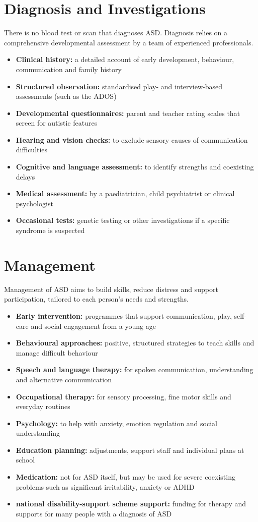 \section*{Diagnosis and Investigations}
There is no blood test or scan that diagnoses ASD. Diagnosis relies on a comprehensive developmental assessment by a team of experienced professionals.

\begin{itemize}
    \item \textbf{Clinical history:} a detailed account of early development, behaviour, communication and family history
    \item \textbf{Structured observation:} standardised play- and interview-based assessments (such as the ADOS)
    \item \textbf{Developmental questionnaires:} parent and teacher rating scales that screen for autistic features
    \item \textbf{Hearing and vision checks:} to exclude sensory causes of communication difficulties
    \item \textbf{Cognitive and language assessment:} to identify strengths and coexisting delays
    \item \textbf{Medical assessment:} by a paediatrician, child psychiatrist or clinical psychologist
    \item \textbf{Occasional tests:} genetic testing or other investigations if a specific syndrome is suspected
\end{itemize}

\section*{Management}
Management of ASD aims to build skills, reduce distress and support participation, tailored to each person's needs and strengths.

\begin{itemize}
    \item \textbf{Early intervention:} programmes that support communication, play, self-care and social engagement from a young age
    \item \textbf{Behavioural approaches:} positive, structured strategies to teach skills and manage difficult behaviour
    \item \textbf{Speech and language therapy:} for spoken communication, understanding and alternative communication
    \item \textbf{Occupational therapy:} for sensory processing, fine motor skills and everyday routines
    \item \textbf{Psychology:} to help with anxiety, emotion regulation and social understanding
    \item \textbf{Education planning:} adjustments, support staff and individual plans at school
    \item \textbf{Medication:} not for ASD itself, but may be used for severe coexisting problems such as significant irritability, anxiety or ADHD
    \item \textbf{national disability-support scheme support:} funding for therapy and supports for many people with a diagnosis of ASD
\end{itemize}

